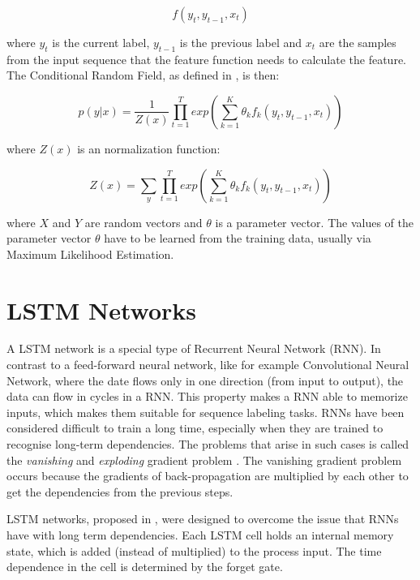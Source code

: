 \documentclass[12pt]{book}
\begin{document}
	\begin{equation}
	f(y_t, y_{t-1}, x_t)
	\end{equation}
	
	where $y_t$ is the current label, $y_{t-1}$ is the previous label and $x_t$ are the samples from the input sequence that the feature function needs to calculate the feature. The Conditional Random Field, as defined in \cite{MAL-013}, is then:
	
	\begin{equation}
	p(y|x) = \frac{1}{Z(x)} \prod_{t=1}^T exp(\sum_{k=1}^{K} \theta_k f_k(y_t, y_{t-1}, x_t))
	\end{equation}
	
	where $Z(x)$ is an normalization function:
	
	\begin{equation}
	Z(x) = \sum_{y} \prod_{t=1}^{T} exp(\sum_{k=1}^{K} \theta_k f_k(y_t, y_{t-1}, x_t))
	\end{equation}
	
	where $X$ and $Y$ are random vectors and $\theta$ is a parameter vector. The values of the parameter vector $\theta$ have to be learned from the training data, usually via Maximum Likelihood Estimation.
	
	\section{LSTM Networks}
	\label{sec:lstm}
	
	A LSTM network is a special type of Recurrent Neural Network (RNN). In contrast to a feed-forward neural network, like for example Convolutional Neural Network, where the date flows only in one direction (from input to output), the data can flow in cycles in a RNN. This property makes a RNN able to memorize inputs, which makes them suitable for sequence labeling tasks.
	RNNs have been considered difficult to train a long time, especially when they are trained to recognise long-term dependencies. The problems that arise in such cases is called the \textit{vanishing} and \textit{exploding} gradient problem \cite{lipton2015critical}. The vanishing gradient problem occurs because the gradients of back-propagation are multiplied by each other to get the dependencies from the previous steps.
	
	LSTM networks, proposed in \cite{hochreiter1997long}, were designed to overcome the issue that RNNs have with long term dependencies. Each LSTM cell holds an internal memory state, which is added (instead of multiplied) to the process input. The time dependence in the cell is determined by the forget gate.
	
\end{document}
